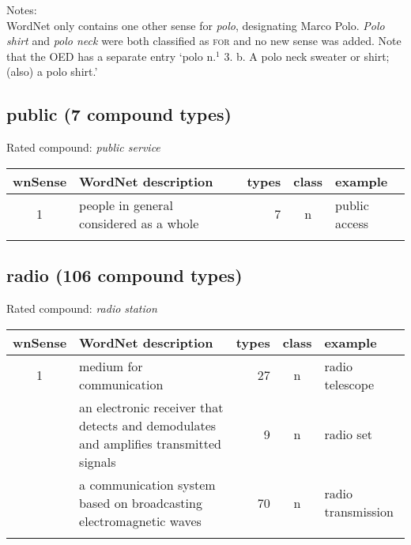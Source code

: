 \noindent
Notes:\\
WordNet only contains one other sense for \emph{polo}, designating Marco Polo. \emph{Polo shirt} and \emph{polo neck} were both classified as \textsc{for} and no new sense was added. Note that the OED has a separate entry `polo n.$^1$ 3. b. A polo neck sweater or shirt; (also) a polo shirt.'


\subsection{public       (7 compound types)}
Rated compound: \emph{public service}


\noindent
\begin{longtable}{c>{\raggedright\arraybackslash}p{5cm}rc>{\raggedright\arraybackslash}p{2cm}}\lsptoprule
{\small wnSense}&WordNet description&types&class&example\\\midrule
1&people in general considered as a whole&7&n&public access\\\lspbottomrule
\end{longtable}


\subsection{radio        (106 compound types)}
Rated compound: \emph{radio station}

\vspace*{1ex}

\noindent
\begin{longtable}{c>{\raggedright\arraybackslash}p{5cm}rc>{\raggedright\arraybackslash}p{2cm}}\lsptoprule
{\small wnSense}&WordNet description&types&class&example\\\midrule
1&medium for communication&27&n&radio telescope\\\tablevspace
2&an electronic receiver that detects and demodulates and amplifies transmitted signals&9&n&radio set\\\tablevspace
3&a communication system based on broadcasting electromagnetic waves&70&n&radio transmission\\\lspbottomrule
\end{longtable}

